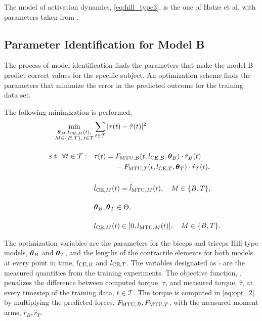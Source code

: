 The model of activation dynamics, \cref{eq:hill_type3}, is the one of Hatze et al. \cite{Hatze1977} with parameters taken from \cite{Bayer2017}.

\subsection{Parameter Identification for Model B}\label{sec:parameter_optimization}

The process of model identification finds the parameters that make the model B predict correct values for the specific subject. An optimization scheme finds the parameters that minimize the error in the predicted outcome for the training data set.

The following minimization is performed,
\begin{align}
  &&\min\limits_{\substack{\boldsymbol{\theta}_M,l_{\text{CE},M}(t), \\M \in \{B,T\}, \,t \in \mathcal{T}}} &\sum\limits_{t\in \mathcal{T}}|\tau(t) - \hat{\tau}(t)|^2
   \label{eq:opt_1}\\[4mm]
  &&\text{s.t. }\forall t \in \mathcal{T}:\quad &\tau(t) = F_{\text{MTU},B}(t,l_{\text{CE},B},\boldsymbol{\theta}_B) \cdot \hat{r}_B(t) \notag\\
      &&&\qquad\quad- F_{\text{MTU},T}(t,l_{\text{CE},T},\boldsymbol{\theta}_T) \cdot \hat{r}_T(t),                 \label{eq:opt_2}\\[4mm]
  &&& \dot{l}_{\text{CE},M}(t) = \dot{\hat{l}}_{\text{MTU},M}(t),\quad M \in \{B,T\},      \label{eq:opt_3}\\[4mm]
  &&& \boldsymbol{\theta}_B, \boldsymbol{\theta}_T \in \Theta,                                       \label{eq:opt_4}\\[4mm]
  &&& l_{\text{CE},M}(t) \in [0,l_{\text{MTU},M}(t)],\quad M \in \{B,T\}.                  \label{eq:opt_5}
\end{align}

The optimization variables are the parameters for the biceps and triceps Hill-type models, $\boldsymbol{\theta}_B$ and $\boldsymbol{\theta}_T$, and the lengths of the contractile elements for both models at every point in time, $l_{\text{CE},B}$ and $l_{\text{CE},T}$. The variables designated as $\hat{\square}$ are the measured quantities from the training experiments. The objective function, , penalizes the difference between computed torque, $\tau$, and measured torque, $\hat{\tau}$, at every timestep of the training data, $t \in \mathcal{T}$. The torque is computed in \cref{eq:opt_2} by multiplying the predicted forces, $F_{\text{MTU},B}, F_{\text{MTU},T}$, with the measured moment arms, $\hat{r}_B, \hat{r}_T$.

